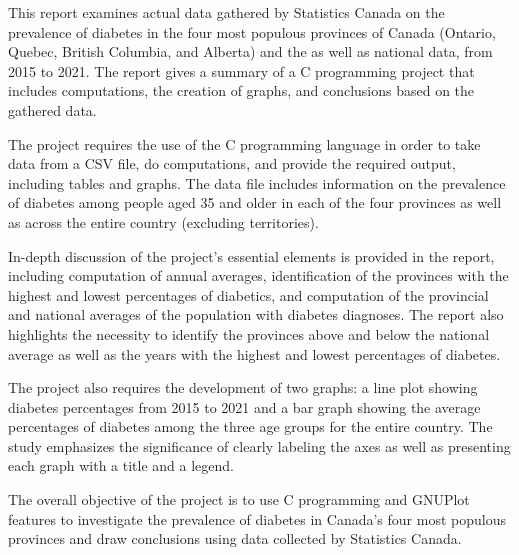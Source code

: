 {This report examines actual data gathered by Statistics Canada on the prevalence of diabetes in the four most populous provinces of Canada (Ontario, Quebec, British Columbia, and Alberta) and the as well as national data,  from 2015 to 2021. The report gives a summary of a C programming project that includes computations, the creation of graphs, and conclusions based on the gathered data.}

{The project requires the use of the C programming language in order to take data from a CSV file, do computations, and provide the required output, including tables and graphs. The data file includes information on the prevalence of diabetes among people aged 35 and older in each of the four provinces as well as across the entire country (excluding territories).}

{In-depth discussion of the project's essential elements is provided in the report, including computation of annual averages, identification of the provinces with the highest and lowest percentages of diabetics, and computation of the provincial and national averages of the population with diabetes diagnoses. The report also highlights the necessity to identify the provinces above and below the national average as well as the years with the highest and lowest percentages of diabetes.}

{The project also requires the development of two graphs: a line plot showing diabetes percentages from 2015 to 2021 and a bar graph showing the average percentages of diabetes among the three age groups for the entire country. The study emphasizes the significance of clearly labeling the axes as well as presenting each graph with a title and a legend.}

{The overall objective of the project is to use C programming and GNUPlot features to investigate the prevalence of diabetes in Canada's four most populous provinces and draw conclusions using data collected by Statistics Canada.}

{}

